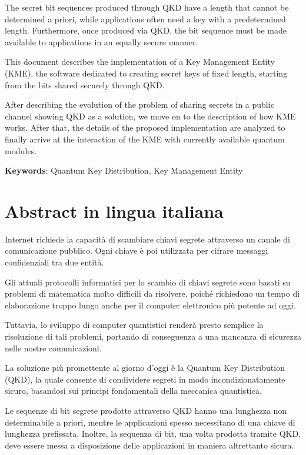 \documentclass{Configuration_Files/PoliMi3i_thesis}
\begin{document}
The secret bit sequences produced through QKD have a length that cannot be determined a priori, while applications often need a key with a predetermined length. Furthermore, once produced via QKD, the bit sequence must be made available to applications in an equally secure manner.

This document describes the implementation of a Key Management Entity (KME), the software dedicated to creating secret keys of fixed length, starting from the bits shared securely through QKD.

After describing the evolution of the problem of sharing secrets in a public channel showing QKD as a solution, we move on to the description of how KME works. After that, the details of the proposed implementation are analyzed to finally arrive at the interaction of the KME with currently available quantum modules.


\textbf{Keywords}: Quantum Key Distribution, Key Management Entity

\chapter*{Abstract in lingua italiana}
Internet richiede la capacità di scambiare chiavi segrete attraverso un canale di comunicazione pubblico. Ogni chiave è poi utilizzata per cifrare messaggi confidenziali tra due entità.

Gli attuali protocolli informatici per lo scambio di chiavi segrete sono basati su problemi di matematica molto difficili da risolvere, poiché richiedono un tempo di elaborazione troppo lungo anche per il computer elettronico più potente ad oggi.

Tuttavia, lo sviluppo di computer quantistici renderà presto semplice la risoluzione di tali problemi, portando di conseguenza a una mancanza di sicurezza nelle nostre comunicazioni.

La soluzione più promettente al giorno d'oggi è la Quantum Key Distribution (QKD), la quale consente di condividere segreti in modo incondizionatamente sicuro, basandosi sui principi fondamentali della meccanica quantistica.

Le sequenze di bit segrete prodotte attraverso QKD hanno una lunghezza non determinabile a priori, mentre le applicazioni spesso necessitano di una chiave di lunghezza prefissata. Inoltre, la sequenza di bit, una volta prodotta tramite QKD, deve essere messa a disposizione delle applicazioni in maniera altrettanto sicura.
\end{document}
